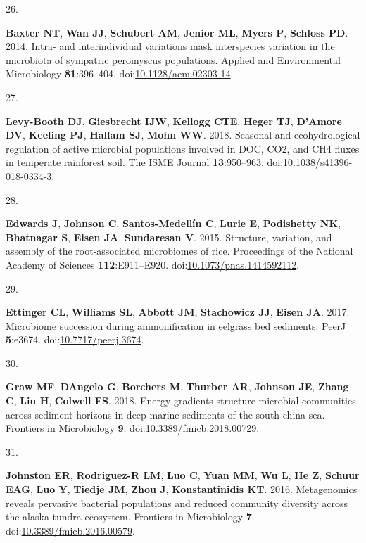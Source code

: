\documentclass[
]{article}
\newlength{\cslhangindent}
\newlength{\csllabelwidth}
\newlength{\cslentryspacingunit} %
\newenvironment{CSLReferences}[2] %
 {%
  \setlength{\parindent}{0pt}
  \ifodd #1
  \let\oldpar\par
  \def\par{\hangindent=\cslhangindent\oldpar}
  \fi
  \setlength{\parskip}{#2\cslentryspacingunit}
 }%
 {}
\newcommand{\CSLLeftMargin}[1]{\parbox[t]{\csllabelwidth}{#1}}
\newcommand{\CSLRightInline}[1]{\parbox[t]{\linewidth - \csllabelwidth}{#1}\break}
\begin{document}
\begin{CSLReferences}{0}{1}
\leavevmode{}%
\CSLLeftMargin{26. }%
\CSLRightInline{\textbf{Baxter NT}, \textbf{Wan JJ}, \textbf{Schubert
AM}, \textbf{Jenior ML}, \textbf{Myers P}, \textbf{Schloss PD}. 2014.
Intra- and interindividual variations mask interspecies variation in the
microbiota of sympatric peromyscus populations. Applied and
Environmental Microbiology \textbf{81}:396--404.
doi:\href{https://doi.org/10.1128/aem.02303-14}{10.1128/aem.02303-14}.}

\leavevmode{}%
\CSLLeftMargin{27. }%
\CSLRightInline{\textbf{Levy-Booth DJ}, \textbf{Giesbrecht IJW},
\textbf{Kellogg CTE}, \textbf{Heger TJ}, \textbf{D'Amore DV},
\textbf{Keeling PJ}, \textbf{Hallam SJ}, \textbf{Mohn WW}. 2018.
Seasonal and ecohydrological regulation of active microbial populations
involved in {DOC}, {CO}2, and {CH}4 fluxes in temperate rainforest soil.
The {ISME} Journal \textbf{13}:950--963.
doi:\href{https://doi.org/10.1038/s41396-018-0334-3}{10.1038/s41396-018-0334-3}.}

\leavevmode{}%
\CSLLeftMargin{28. }%
\CSLRightInline{\textbf{Edwards J}, \textbf{Johnson C},
\textbf{Santos-Medellín C}, \textbf{Lurie E}, \textbf{Podishetty NK},
\textbf{Bhatnagar S}, \textbf{Eisen JA}, \textbf{Sundaresan V}. 2015.
Structure, variation, and assembly of the root-associated microbiomes of
rice. Proceedings of the National Academy of Sciences
\textbf{112}:E911--E920.
doi:\href{https://doi.org/10.1073/pnas.1414592112}{10.1073/pnas.1414592112}.}

\leavevmode{}%
\CSLLeftMargin{29. }%
\CSLRightInline{\textbf{Ettinger CL}, \textbf{Williams SL},
\textbf{Abbott JM}, \textbf{Stachowicz JJ}, \textbf{Eisen JA}. 2017.
Microbiome succession during ammonification in eelgrass bed sediments.
{PeerJ} \textbf{5}:e3674.
doi:\href{https://doi.org/10.7717/peerj.3674}{10.7717/peerj.3674}.}

\leavevmode{}%
\CSLLeftMargin{30. }%
\CSLRightInline{\textbf{Graw MF}, \textbf{DAngelo G}, \textbf{Borchers
M}, \textbf{Thurber AR}, \textbf{Johnson JE}, \textbf{Zhang C},
\textbf{Liu H}, \textbf{Colwell FS}. 2018. Energy gradients structure
microbial communities across sediment horizons in deep marine sediments
of the south china sea. Frontiers in Microbiology \textbf{9}.
doi:\href{https://doi.org/10.3389/fmicb.2018.00729}{10.3389/fmicb.2018.00729}.}

\leavevmode{}%
\CSLLeftMargin{31. }%
\CSLRightInline{\textbf{Johnston ER}, \textbf{Rodriguez-R LM},
\textbf{Luo C}, \textbf{Yuan MM}, \textbf{Wu L}, \textbf{He Z},
\textbf{Schuur EAG}, \textbf{Luo Y}, \textbf{Tiedje JM}, \textbf{Zhou
J}, \textbf{Konstantinidis KT}. 2016. Metagenomics reveals pervasive
bacterial populations and reduced community diversity across the alaska
tundra ecosystem. Frontiers in Microbiology \textbf{7}.
doi:\href{https://doi.org/10.3389/fmicb.2016.00579}{10.3389/fmicb.2016.00579}.}


\end{CSLReferences}
\end{document}
